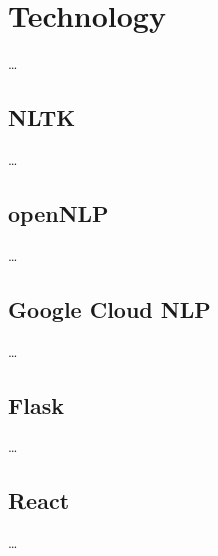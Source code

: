 \section{Technology}

\dots

\subsection{NLTK}

\dots

\subsection{openNLP}

\dots

\subsection{Google Cloud NLP}

\dots

\subsection{Flask}

\dots

\subsection{React}

\dots
